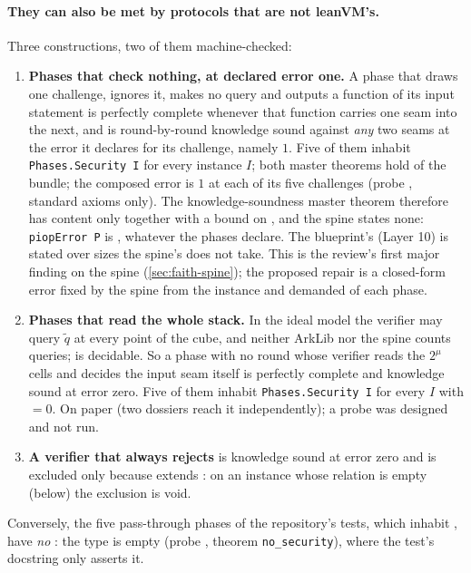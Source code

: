 \paragraph{They can also be met by protocols that are not leanVM's.} Three constructions,
two of them machine-checked:
\begin{enumerate}
\item \textbf{Phases that check nothing, at declared error one.} A phase that draws one
  challenge, ignores it, makes no query and outputs a function of its input statement is
  perfectly complete whenever that function carries one seam into the next, and is
  round-by-round knowledge sound against \emph{any} two seams at the error it declares for its
  challenge, namely $1$. Five of them inhabit \texttt{Phases.Security I} for every instance
  $I$; both master theorems hold of the bundle; the composed error is $1$ at each of its five
  challenges (probe , standard axioms only). The knowledge-soundness master theorem
  therefore has content only together with a bound on , and the spine states
  none: \texttt{piopError P} is , whatever the phases declare. The blueprint's
   (Layer 10) is stated over sizes the spine's  does not take.
  This is the review's first major finding on the spine (\cref{sec:faith-spine}); the proposed
  repair is a closed-form error fixed by the spine from the instance and demanded of each phase.
\item \textbf{Phases that read the whole stack.} In the ideal model the verifier may query
  $\widetilde{q}$ at every point of the cube, and neither ArkLib nor the spine counts queries;
   is decidable. So a phase with no round whose verifier reads the $2^{\mu}$ cells
  and decides the input seam itself is perfectly complete and knowledge sound at error zero.
  Five of them inhabit \texttt{Phases.Security I} for every $I$ with  $= 0$. On
  paper (two dossiers reach it independently); a probe was designed and not run.
\item \textbf{A verifier that always rejects} is knowledge sound at error zero and is excluded
  only because  extends : on an instance whose relation is empty
  (below) the exclusion is void.
\end{enumerate}
Conversely, the five pass-through phases of the repository's tests, which inhabit
, have \emph{no} : the type is empty (probe
, theorem \texttt{no\_security}), where the test's docstring only asserts it.

